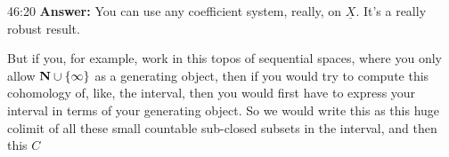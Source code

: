 \begin{unfinished}{46:20}
\textbf{Answer:} You can use any coefficient system, really, on $\underline{X}$. It's a really robust result.

But if you, for example, work in this topos of sequential spaces, where you only allow $\mathbf N \cup \{\infty\}$ as a generating object, then if you would try to compute this cohomology of, like, the interval, then you would first have to express your interval in terms of your generating object. So we would write this as this huge colimit of all these small countable sub-closed subsets in the interval, and then this $C$

\end{unfinished}